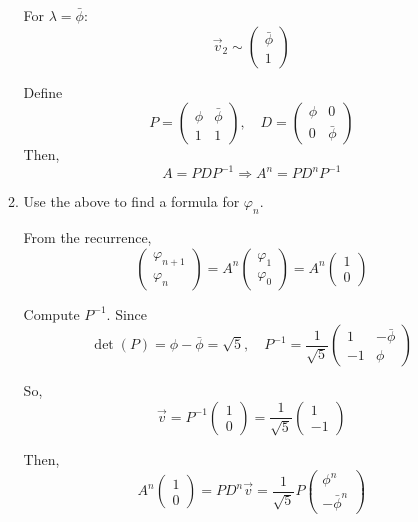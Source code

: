 \documentclass[12pt]{article}
\begin{document}
\begin{enumerate}
\begin{enumerate}
    For $\lambda = \bar{\phi}$:
    \[
    \vec{v}_2 \sim \begin{pmatrix}
    \bar{\phi} \\
    1
    \end{pmatrix}
    \]

    Define
    \[
    P = \begin{pmatrix}
    \phi & \bar{\phi} \\
    1 & 1
    \end{pmatrix},
    \quad
    D = \begin{pmatrix}
    \phi & 0 \\
    0 & \bar{\phi}
    \end{pmatrix}
    \]
    Then,
    \[
    A = P D P^{-1} \Rightarrow A^n = P D^n P^{-1}
    \]

    \item Use the above to find a formula for $\varphi_n$.

    From the recurrence,
    \[
    \begin{pmatrix}
    \varphi_{n+1} \\
    \varphi_n
    \end{pmatrix}
    =
    A^n
    \begin{pmatrix}
    \varphi_1 \\
    \varphi_0
    \end{pmatrix}
    =
    A^n
    \begin{pmatrix}
    1 \\
    0
    \end{pmatrix}
    \]

    Compute $P^{-1}$. Since
    \[
    \det(P) = \phi - \bar{\phi} = \sqrt{5},
    \quad
    P^{-1} = \frac{1}{\sqrt{5}} \begin{pmatrix}
    1 & -\bar{\phi} \\
    -1 & \phi
    \end{pmatrix}
    \]

    So,
    \[
    \vec{v} = P^{-1} \begin{pmatrix} 1 \\ 0 \end{pmatrix} = \frac{1}{\sqrt{5}} \begin{pmatrix} 1 \\ -1 \end{pmatrix}
    \]

    Then,
    \[
    A^n \begin{pmatrix} 1 \\ 0 \end{pmatrix} = P D^n \vec{v}
    = \frac{1}{\sqrt{5}} P \begin{pmatrix}
    \phi^n \\
    -\bar{\phi}^n
    \end{pmatrix}
    \]


\end{enumerate}
\end{enumerate}
\end{document}
